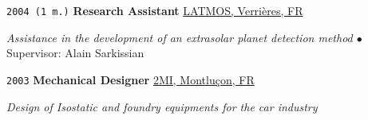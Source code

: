 \noindent \texttt{2004 (1 m.)} \tab \textbf{Research Assistant} \tab
\href{https://www3.latmos.ipsl.fr/index.php/fr/accueil-latmos}{LATMOS, Verrières, FR}
\vspace{.3em}
\begin{adjustwidth}{7em}{}
\textit{Assistance in the development of an extrasolar planet detection method $\bullet$} Supervisor: Alain Sarkissian
\end{adjustwidth}
\vspace{.5em}

\noindent \texttt{2003} \tab \textbf{Mechanical Designer} \tab
\href{http://www.2migroup.eu/fr/}{2MI, Montluçon, FR}
\vspace{.3em}
\begin{adjustwidth}{7em}{}
\textit{Design of Isostatic and foundry equipments for the car industry}
\end{adjustwidth}